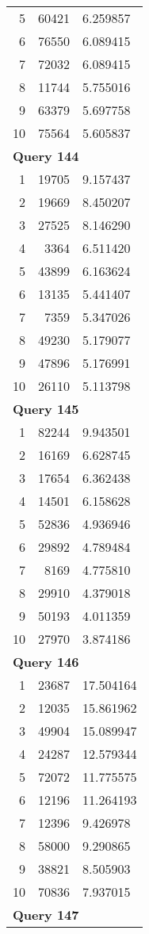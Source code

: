 \begin{longtable}[{p}]{@{}rrp{}@{}}
5 & 60421 & 6.259857 \\
6 & 76550 & 6.089415 \\
7 & 72032 & 6.089415 \\
8 & 11744 & 5.755016 \\
9 & 63379 & 5.697758 \\
10 & 75564 & 5.605837 \\
\midrule
\multicolumn{3}{l}{\bfseries Query 144} \\
1 & 19705 & 9.157437 \\
2 & 19669 & 8.450207 \\
3 & 27525 & 8.146290 \\
4 & 3364 & 6.511420 \\
5 & 43899 & 6.163624 \\
6 & 13135 & 5.441407 \\
7 & 7359 & 5.347026 \\
8 & 49230 & 5.179077 \\
9 & 47896 & 5.176991 \\
10 & 26110 & 5.113798 \\
\midrule
\multicolumn{3}{l}{\bfseries Query 145} \\
1 & 82244 & 9.943501 \\
2 & 16169 & 6.628745 \\
3 & 17654 & 6.362438 \\
4 & 14501 & 6.158628 \\
5 & 52836 & 4.936946 \\
6 & 29892 & 4.789484 \\
7 & 8169 & 4.775810 \\
8 & 29910 & 4.379018 \\
9 & 50193 & 4.011359 \\
10 & 27970 & 3.874186 \\
\midrule
\multicolumn{3}{l}{\bfseries Query 146} \\
1 & 23687 & 17.504164 \\
2 & 12035 & 15.861962 \\
3 & 49904 & 15.089947 \\
4 & 24287 & 12.579344 \\
5 & 72072 & 11.775575 \\
6 & 12196 & 11.264193 \\
7 & 12396 & 9.426978 \\
8 & 58000 & 9.290865 \\
9 & 38821 & 8.505903 \\
10 & 70836 & 7.937015 \\
\midrule
\multicolumn{3}{l}{\bfseries Query 147} \\

\end{longtable}
